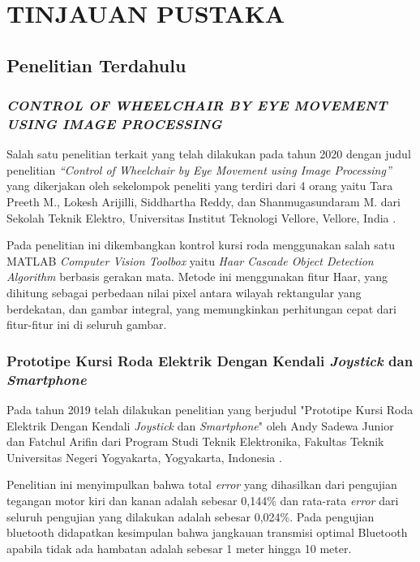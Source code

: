 \chapter{TINJAUAN PUSTAKA}
\label{chap:tinjauanpustaka}


\section{Penelitian Terdahulu}
\label{sec:PenelitianTerdahulu}

\subsection{\textit{CONTROL OF WHEELCHAIR BY EYE MOVEMENT USING IMAGE PROCESSING}}

Salah satu penelitian terkait yang telah dilakukan pada tahun 2020 dengan judul penelitian \textit{“Control of Wheelchair by Eye Movement using Image Processing”} yang dikerjakan oleh sekelompok peneliti yang terdiri dari 4 orang yaitu Tara Preeth M., Lokesh Arijilli, Siddhartha Reddy, dan Shanmugasundaram M. dari Sekolah Teknik Elektro, Universitas Institut Teknologi Vellore, Vellore, India \parencite{control_2020}.

Pada penelitian ini dikembangkan kontrol kursi roda menggunakan salah satu MATLAB \textit{Computer Vision Toolbox} yaitu\textit{ Haar Cascade Object Detection Algorithm} berbasis gerakan mata. Metode ini menggunakan fitur Haar, yang dihitung sebagai perbedaan nilai pixel antara wilayah rektangular yang berdekatan, dan gambar integral, yang memungkinkan perhitungan cepat dari fitur-fitur ini di seluruh gambar.

\subsection{Prototipe Kursi Roda Elektrik Dengan Kendali \emph{Joystick} dan \emph{Smartphone}}

Pada tahun 2019 telah dilakukan penelitian yang berjudul "Prototipe Kursi Roda Elektrik Dengan Kendali \emph{Joystick} dan \emph{Smartphone}" oleh Andy Sadewa Junior dan Fatchul Arifin dari Program Studi Teknik Elektronika, Fakultas Teknik Universitas Negeri Yogyakarta, Yogyakarta, Indonesia \parencite{junior2019prototipe}.

Penelitian ini menyimpulkan bahwa total \emph{error} yang dihasilkan dari pengujian tegangan motor kiri dan kanan adalah sebesar 0,144\% dan rata-rata \emph{error} dari seluruh pengujian yang dilakukan adalah sebesar 0,024\%. Pada pengujian bluetooth didapatkan kesimpulan bahwa jangkauan transmisi optimal Bluetooth apabila tidak ada hambatan adalah sebesar 1 meter hingga 10 meter.

